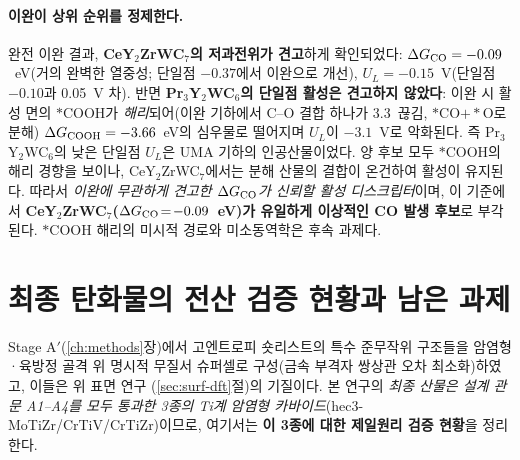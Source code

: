 \documentclass[11pt,a4paper]{report}
\begin{document}
\paragraph{이완이 상위 순위를 정제한다.} 완전 이완 결과, \textbf{CeY$_2$ZrWC$_7$의 저과전위가 견고}하게
확인되었다: $\Delta G_{\rm CO}=-0.09$~eV(거의 완벽한 열중성; 단일점 $-0.37$에서 이완으로 개선),
$U_L=-0.15$~V(단일점 $-0.10$과 0.05~V 차). 반면 \textbf{Pr$_3$Y$_2$WC$_6$의 단일점 활성은 견고하지
않았다}: 이완 시 활성 면의 $*$COOH가 \emph{해리}되어(이완 기하에서 C--O 결합 하나가 3.3~ 끊김,
$*$CO$+*$O로 분해) $\Delta G_{\rm COOH}=-3.66$~eV의 심우물로 떨어지며 $U_L$이 $-3.1$~V로 악화된다. 즉
Pr$_3$Y$_2$WC$_6$의 낮은 단일점 $U_L$은 UMA 기하의 인공산물이었다. 양 후보 모두 $*$COOH의 해리 경향을
보이나, CeY$_2$ZrWC$_7$에서는 분해 산물의 결합이 온건하여 활성이 유지된다. 따라서 \emph{이완에 무관하게
견고한 $\Delta G_{\rm CO}$가 신뢰할 활성 디스크립터}이며, 이 기준에서 \textbf{CeY$_2$ZrWC$_7$($\Delta
G_{\rm CO}\!=\!-0.09$~eV)가 유일하게 이상적인 CO 발생 후보}로 부각된다. $*$COOH 해리의 미시적 경로와
미소동역학은 후속 과제다.

\section{최종 탄화물의 전산 검증 현황과 남은 과제}
\label{sec:outstanding}
Stage A$'$(\ref{ch:methods}장)에서 고엔트로피 숏리스트의 특수 준무작위 구조들을 암염형·육방정 골격 위
명시적 무질서 슈퍼셀로 구성(금속 부격자 쌍상관 오차 최소화)하였고, 이들은 위 표면 연구
(\ref{sec:surf-dft}절)의 기질이다. 본 연구의 \emph{최종 산물은 설계 관문 A1--A4를 모두 통과한 3종의
Ti계 암염형 카바이드}(hec3-MoTiZr/CrTiV/CrTiZr)이므로, 여기서는 \textbf{이 3종에 대한 제일원리 검증
현황}을 정리한다.
\end{document}
